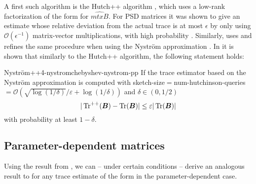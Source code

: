 A first such algorithm is the Hutch++ algorithm \cite[algorithm~1]{meyer2021hutch}, which
uses a low-rank factorization of the form  for
$\widehat{mtx{B}}$. For \gls{PSD} matrices it was shown to give
an estimate whose relative deviation from the actual trace is at most
$\epsilon$ by only using $\mathcal{O}(\epsilon^{-1})$ matrix-vector multiplications,
with high probability \cite[theorem~1]{meyer2021hutch}. Similarly, \cite{lin2017randomized}
uses and \cite{persson2022hutch} refines the same procedure when using
the Nystr\"om approximation . In \cite[theorem~3.4]{persson2022hutch}
it is shown that similarly to the Hutch++ algorithm, the following statement holds:
\begin{theorem}{Nystr\"om++}{4-nystromchebyshev-nystrom-pp}
    If the trace estimator  based
    on the Nystr\"om approximation is computed
    with \gls{sketch-size}$ = $\gls{num-hutchinson-queries}$ = \mathcal{O}(\sqrt{\log(1/\delta)}/\varepsilon + \log(1/\delta))$
    and $\delta \in (0, 1/2)$
    \begin{equation}
        |\operatorname{Tr}^{++}(\boldsymbol{B}) - \operatorname{Tr}(\boldsymbol{B})| \leq \varepsilon |\operatorname{Tr}(\boldsymbol{B})|
    \end{equation}
    with probability at least $1-\delta$.
\end{theorem}

\subsection{Parameter-dependent matrices}
\label{subsec:4-nystromchebyshev-reduction-parametrized-matrices}

Using the result from ,
we can -- under certain conditions -- derive an analogous result
to  for any trace estimate of the form
 in the parameter-dependent case.

